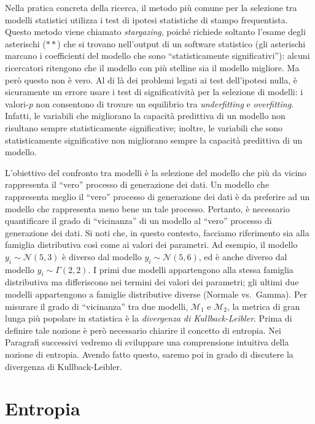 \documentclass[
  10pt,
  italian,
  a4paper,
  extrafontsizes,onecolumn,openright
  ]{memoir}
\newlength{\rf}
\theoremstyle{definition}
\theoremstyle{definition}
\theoremstyle{definition}
\theoremstyle{definition}
\theoremstyle{remark}
\begin{document}
Nella pratica concreta della ricerca, il metodo più comune per la selezione tra modelli statistici utilizza i test di ipotesi statistiche di stampo frequentista. Questo metodo viene chiamato \emph{stargazing}, poiché richiede soltanto l'esame degli asterischi (\(**\)) che si trovano nell'output di un software statistico (gli asterischi marcano i coefficienti del modello che sono ``statisticamente significativi''): alcuni ricercatori ritengono che il modello con più stelline sia il modello migliore. Ma però questo non è vero. Al di là dei problemi legati ai test dell'ipotesi nulla, è sicuramente un errore usare i test di significatività per la selezione di modelli: i valori-\emph{p} non consentono di trovare un equilibrio tra \emph{underfitting} e \emph{overfitting}. Infatti, le variabili che migliorano la capacità predittiva di un modello non risultano sempre statisticamente significative; inoltre, le variabili che sono statisticamente significative non migliorano sempre la capacità predittiva di un modello.

L'obiettivo del confronto tra modelli è la selezione del modello che più da vicino rappresenta il ``vero'' processo di generazione dei dati. Un modello che rappresenta meglio il ``vero'' processo di generazione dei dati è da preferire ad un modello che rappresenta meno bene un tale processo. Pertanto, è necessario quantificare il grado di ``vicinanza'' di un modello al ``vero'' processo di generazione dei dati. Si noti che, in questo contesto, facciamo riferimento sia alla famiglia distributiva così come ai valori dei parametri. Ad esempio, il modello \(y_i \sim \mathcal{N}(5, 3)\) è diverso dal modello \(y_i \sim \mathcal{N}(5, 6)\), ed è anche diverso dal modello \(y_i \sim \Gamma(2, 2)\). I primi due modelli appartengono alla stessa famiglia distributiva ma differiscono nei termini dei valori dei parametri; gli ultimi due modelli appartengono a famiglie distributive diverse (Normale vs.~Gamma). Per misurare il grado di ``vicinanza'' tra due modelli, \(\mathcal{M}_1\) e \(\mathcal{M}_2\), la metrica di gran lunga più popolare in statistica è la \emph{divergenza di Kullback-Leibler}. Prima di definire tale nozione è però necessario chiarire il concetto di entropia. Nei Paragrafi successivi vedremo di sviluppare una comprensione intuitiva della nozione di entropia. Avendo fatto questo, saremo poi in grado di discutere la divergenza di Kullback-Leibler.

\hypertarget{entropia}{%
\section{Entropia}\label{entropia}}
\end{document}
